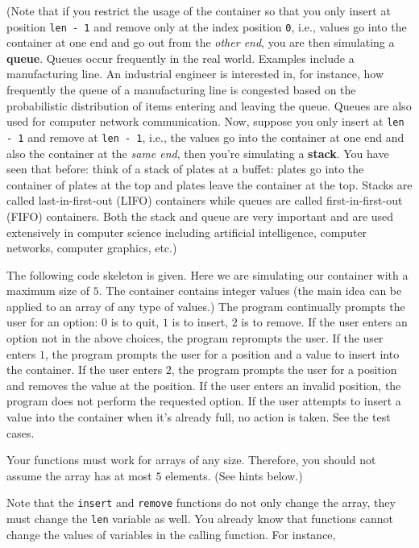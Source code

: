 (Note that if you restrict the usage of the container so that you only insert
at position \verb!len - 1!  and remove only at the index
position \verb!0!, i.e., values go into the container
at one end and go out from the \textit{other end},
you are then simulating a \textbf{queue}.
Queues occur frequently in the real world.
Examples
include a manufacturing line. An industrial engineer is interested in, for
instance, how frequently the queue of a manufacturing
line is congested based on the probabilistic
distribution of items entering and leaving the queue. Queues are also used
for computer network communication.
Now, suppose you only insert at \verb!len - 1! and remove at
\verb!len - 1!, i.e., the values go into the container at one end and also
the container at the \textit{same end}, then you're simulating a
\textbf{stack}.
You have seen that before: think of a stack of plates at a buffet:
plates go into the container of plates at the top and plates
leave the container at the top.
Stacks are called last-in-first-out (LIFO) containers
while queues are called first-in-first-out (FIFO) containers.
Both the stack and queue are very important
and are used extensively in computer science
including artificial intelligence, computer networks, computer graphics, etc.)

The following code skeleton is given. Here we are simulating our container
with a maximum size of $5$. The container contains integer values (the main
idea can be applied to an array of any type of values.) The program continually
prompts the user for an option: $0$ is to quit, $1$ is to insert, $2$ is to
remove. If the user enters an option not in the above choices, the program
reprompts the user. If the user enters $1$, the program prompts the user for
a position and a value to insert into the container. If the user enters $2$,
the program prompts the user for a position and removes the value at the
position. If the user enters an invalid position, the program does not perform
the requested option. If the user attempts to insert a value into the container
when it's already full, no action is taken. See the test cases.

Your functions must work for arrays of any size. Therefore, you should not
assume the array has at most $5$ elements. (See hints below.)

Note that the \verb!insert! and \verb!remove! functions do not only change the
array, they must change the \verb!len! variable as well. You already know that
functions cannot change the values of variables in the calling function.
For instance,

